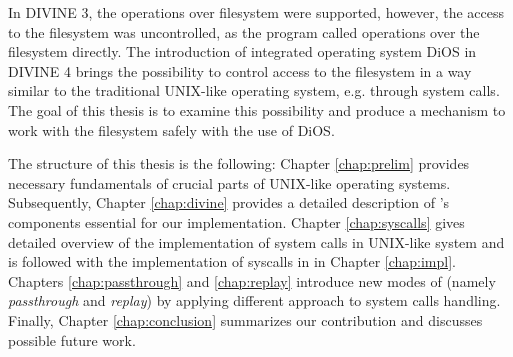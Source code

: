 In DIVINE 3, the operations over filesystem were supported, however, the access to the filesystem was uncontrolled, as the program called operations over the filesystem directly. 
The introduction of integrated operating system DiOS in DIVINE 4 brings the possibility to control access to the filesystem in a way similar to the traditional UNIX-like operating system, e.g. through system calls. The goal of this thesis is to examine this possibility and produce a mechanism to work with the filesystem safely with the use of DiOS.

The structure of this thesis is the following: Chapter \ref{chap:prelim} provides necessary fundamentals of crucial parts of UNIX-like operating systems. Subsequently, Chapter \ref{chap:divine} provides a detailed description of \divine's components essential for our implementation. Chapter \ref{chap:syscalls} gives detailed overview of the implementation of system calls in UNIX-like system and is followed with the implementation of syscalls in \divine in Chapter \ref{chap:impl}. Chapters \ref{chap:passthrough} and \ref{chap:replay} introduce new modes of \dios (namely \textit{passthrough} and \textit{replay}) by applying different approach to system calls handling. Finally, Chapter \ref{chap:conclusion} summarizes our contribution and discusses possible future work.

